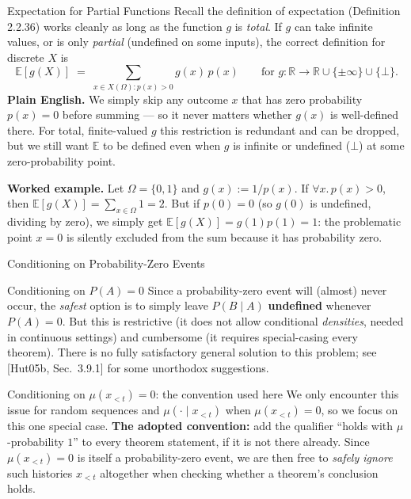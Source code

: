 \documentclass[aspectratio=169,10pt]{beamer}
\newcommand{\E}{\mathbb{E}}
\begin{document}
\begin{frame}{Expectation for Partial Functions}
  Recall the definition of expectation (Definition 2.2.36) works cleanly as
  long as the function $g$ is \emph{total}. If $g$ can take infinite values,
  or is only \emph{partial} (undefined on some inputs), the correct
  definition for discrete $X$ is
  \[
    \E[g(X)] \;=\; \sum_{x\in X(\Omega): p(x)>0} g(x)\,p(x)
    \qquad \text{for } g: \mathbb{R}\to\mathbb{R}\cup\{\pm\infty\}\cup\{\bot\}.
  \]
  \textbf{Plain English.} We simply skip any outcome $x$ that has zero
  probability $p(x)=0$ before summing --- so it never matters whether $g(x)$
  is well-defined there. For total, finite-valued $g$ this restriction is
  redundant and can be dropped, but we still want $\E$ to be defined even
  when $g$ is infinite or undefined ($\bot$) at some zero-probability point.

  \textbf{Worked example.} Let $\Omega=\{0,1\}$ and $g(x):=1/p(x)$. If
  $\forall x.\,p(x)>0$, then $\E[g(X)] = \sum_{x\in\Omega} 1 = 2$. But if
  $p(0)=0$ (so $g(0)$ is undefined, dividing by zero), we simply get
  $\E[g(X)] = g(1)p(1) = 1$: the problematic point $x=0$ is silently
  excluded from the sum because it has probability zero.
\end{frame}

\begin{frame}{Conditioning on Probability-Zero Events}
  \begin{block}{Conditioning on $P(A)=0$}
    Since a probability-zero event will (almost) never occur, the
    \emph{safest} option is to simply leave $P(B\mid A)$ \textbf{undefined}
    whenever $P(A)=0$. But this is restrictive (it does not allow
    conditional \emph{densities}, needed in continuous settings) and
    cumbersome (it requires special-casing every theorem). There is no
    fully satisfactory general solution to this problem; see [Hut05b,
    Sec.\ 3.9.1] for some unorthodox suggestions.
  \end{block}

  \begin{block}{Conditioning on $\mu(x_{<t})=0$: the convention used here}
    We only encounter this issue for random sequences and $\mu(\cdot\mid
    x_{<t})$ when $\mu(x_{<t})=0$, so we focus on this one special case.
    \textbf{The adopted convention:} add the qualifier ``holds with
    $\mu$-probability $1$'' to every theorem statement, if it is not there
    already. Since $\mu(x_{<t})=0$ is itself a probability-zero event, we
    are then free to \emph{safely ignore} such histories $x_{<t}$
    altogether when checking whether a theorem's conclusion holds.
  \end{block}
\end{frame}
\end{document}

